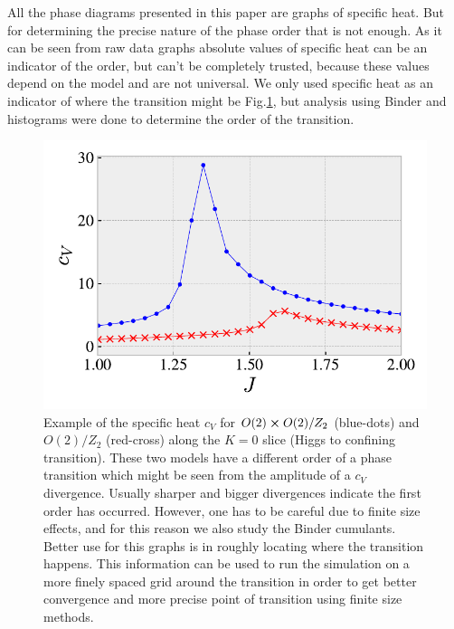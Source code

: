 All the phase diagrams presented in this paper are graphs of specific heat. But for determining the precise nature of the phase order that is not enough. As it can be seen from raw data graphs absolute values of specific heat can be an indicator of the order, but can't be completely trusted, because these values depend on the model and are not universal. We only used specific heat as an indicator of where the transition might be Fig.\ref{cvExample}, but analysis using Binder and histograms were done to determine the order of the transition.
\begin{figure}[!h]
	\centering
	\includegraphics[scale=.7]{figures/chapter2/cvExample.pdf}
	\caption{Example of the specific heat $c_V$ for $O(2) \cross O(2) / Z_2$ (blue-dots) and $O(2)/Z_2$ (red-cross) along the $K=0$ slice (Higgs to confining transition). These two models have a different order of a phase transition which might be seen from the amplitude of a $c_V$ divergence. Usually sharper and bigger divergences indicate the first order has occurred. However, one has to be careful due to finite size effects, and for this reason we also study the Binder cumulants. Better use for this graphs is in roughly locating where the transition happens. This information can be used to run the simulation on a more finely spaced grid around the transition in order to get better convergence and more precise point of transition using finite size methods.}
	\label{cvExample}	
\end{figure}